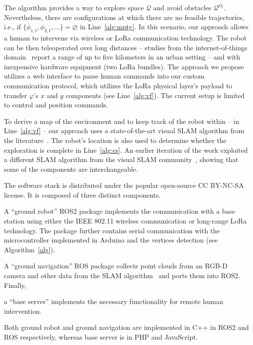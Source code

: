 \documentclass[letterpaper,10pt,conference,twoside]{IEEEtran}
\makeatletter
\theoremstyle{definition}
\newcommand\footnoteref[1]{\protected@xdef\@thefnmark{\ref{#1}}\@footnotemark}
\makeatother
\begin{document}
The %
algorithm provides a way to explore space $\mathcal{Q}$ and avoid obstacles $\mathcal{Q}^{O_i}$. 
Nevertheless, there are configurations at which there are no feasible trajectories, i.e., if $\{\phi_{1,t},\phi_{2,t},\dots\}=\varnothing$ in Line~\ref{alg:mpty}. In this scenario, %
our approach allows a human to intervene via %
wireless or LoRa communication technology. The robot can be then teleoperated over long distances -- studies from the internet-of-things domain~\cite{shanmuga2020survey%
} report a range of up to five kilometers in an urban setting -- and with %
inexpensive hardware equipment (two LoRa bundles). The %
approach we propose utilizes a web interface to parse human commands into our custom communication protocol, which utilizes the LoRa physical layer's payload to transfer $\varphi$'s $x$ and $y$ components (see Line~\ref{alg:vf}). The current setup is limited to control and position commands.

To derive a map of the environment and to keep %
track of the robot within -- in Line~\ref{alg:vf} -- our %
approach uses a state-of-the-art visual SLAM algorithm from the literature~\cite{labbe2019rtab}. The robot's location is also used to determine whether the exploration is complete in Line~\ref{alg:cs}. %
An earlier iteration of the work exploited a different SLAM algorithm from the visual SLAM community~\cite{campos2021orb}, showing that some of the %
components are interchangeable.

The %
software stack 
is distributed under the popular open-source CC BY-NC-SA license\footnoteref{link}. %
It is composed of three distinct components. 
\begin{enumerate*}[label={(\roman*)},font={\textit}]
  \item A ``ground robot'' ROS2 %
package implements the communication with a base station using either the IEEE 802.11 wireless communication or long-range LoRa technology. The package further %
contains serial communication with the microcontroller implemented in Arduino and the vertices detection (see Algorithm~\ref{alg}). 
  \item A ``ground navigation'' ROS package collects point clouds from an RGB-D camera %
and other data from the SLAM algorithm~\cite{labbe2019rtab} and ports them into ROS2. Finally, 
  \item a ``base server'' implements the necessary functionality for remote human intervention.
\end{enumerate*}
Both ground robot and ground navigation are implemented in C++ in ROS2 and ROS respectively, whereas base server is in PHP and JavaScript.
\end{document}
